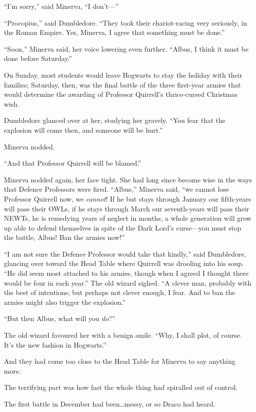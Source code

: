 “I’m sorry,” said Minerva,
“I don’t—”

“Procopius,” said Dumbledore.
“They took their chariot-racing very seriously, in the Roman Empire. Yes, Minerva, I agree that something must be done.”

“Soon,” Minerva said, her voice lowering even further.
“Albus, I think it must be done before Saturday.”

On Sunday, most students would leave Hogwarts to stay the holiday with their families; Saturday, then, was the final battle of the three first-year armies that would determine the awarding of Professor Quirrell’s thrice-cursed Christmas wish.

Dumbledore glanced over at her, studying her gravely.
“You fear that the explosion will come then, and someone will be hurt.”

Minerva nodded.

“And that Professor Quirrell will be blamed.”

Minerva nodded again, her face tight. She had long since become wise in the ways that Defence Professors were fired.
“Albus,” Minerva said, “we cannot lose Professor Quirrell now, we \emph{cannot}! If he but stays through January our fifth-years will pass their OWLs, if he stays through March our seventh-years will pass their NEWTs, he is remedying years of neglect in months, a whole generation will grow up able to defend themselves in spite of the Dark Lord’s curse—you must stop the battle, Albus! Ban the armies now!”

“I am not sure the Defence Professor would take that kindly,” said Dumbledore, glancing over toward the Head Table where Quirrell was drooling into his soup.
“He did seem most attached to his armies, though when I agreed I thought there would be four in each year.” The old wizard sighed.
“A clever man, probably with the best of intentions; but perhaps not clever enough, I fear. And to ban the armies might also trigger the explosion.”

“But then Albus, what will you \emph{do}?”

The old wizard favoured her with a benign smile.
“Why, I shall plot, of course. It’s the new fashion in Hogwarts.”

And they had come too close to the Head Table for Minerva to say anything more.

\later

The terrifying part was how fast the whole thing had spiralled out of control.

The first battle in December had been…messy, or so Draco had heard.

